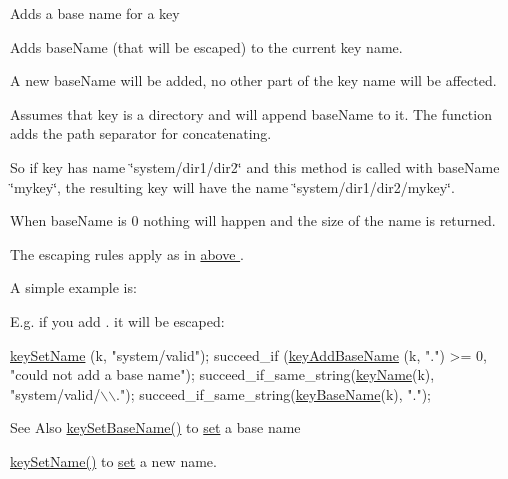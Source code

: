 Adds a base name for a key

Adds {\ttfamily base\-Name} (that will be escaped) to the current key name.

A new base\-Name will be added, no other part of the key name will be affected.

Assumes that {\ttfamily key} is a directory and will append {\ttfamily base\-Name} to it. The function adds the path separator for concatenating.

So if {\ttfamily key} has name {\ttfamily \char`\"{}system/dir1/dir2\char`\"{}} and this method is called with {\ttfamily base\-Name} {\ttfamily \char`\"{}mykey\char`\"{}}, the resulting key will have the name {\ttfamily \char`\"{}system/dir1/dir2/mykey\char`\"{}}.

When {\ttfamily base\-Name} is 0 nothing will happen and the size of the name is returned.

The escaping rules apply as in \hyperlink{group__keyname}{above }.

A simple example is\-: 
 E.\-g. if you add . it will be escaped\-: 
\begin{DoxyCodeInclude}
\hyperlink{group__keyname_ga7699091610e7f3f43d2949514a4b35d9}{keySetName} (k, \textcolor{stringliteral}{"system/valid"});
succeed\_if (\hyperlink{group__keyname_gaa942091fc4bd5c2699e49ddc50829524}{keyAddBaseName} (k, \textcolor{stringliteral}{"."}) >= 0, \textcolor{stringliteral}{"could not add a base
       name"});
succeed\_if\_same\_string(\hyperlink{group__keyname_ga8e805c726a60da921d3736cda7813513}{keyName}(k), \textcolor{stringliteral}{"system/valid/\(\backslash\)\(\backslash\)."});
succeed\_if\_same\_string(\hyperlink{group__keyname_gaaff35e7ca8af5560c47e662ceb9465f5}{keyBaseName}(k), \textcolor{stringliteral}{"."});
\end{DoxyCodeInclude}
 \begin{DoxySeeAlso}{See Also}
\hyperlink{group__keyname_ga6e804bd453f98c28b0ff51430d1df407}{key\-Set\-Base\-Name()} to \hyperlink{classkdb_1_1Key_a615124f0a2b291e03975b49c233654d7}{set} a base name 

\hyperlink{group__keyname_ga7699091610e7f3f43d2949514a4b35d9}{key\-Set\-Name()} to \hyperlink{classkdb_1_1Key_a615124f0a2b291e03975b49c233654d7}{set} a new name.
\end{DoxySeeAlso}

